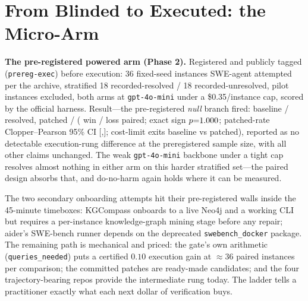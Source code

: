 \documentclass[11pt]{article}
\begin{document}
\section{From Blinded to Executed: the Micro-Arm}
\label{sec:gap}
\EXECpara{}

\textbf{The pre-registered powered arm (Phase 2).} Registered and publicly
tagged (\texttt{prereg-exec}) before execution: 36 fixed-seed instances
SWE-agent attempted per the archive, stratified 18 recorded-resolved / 18
recorded-unresolved, pilot instances excluded, both arms at
\texttt{gpt-4o-mini} under a \$0.35/instance cap, scored by the official
harness. Result---the pre-registered \emph{null} branch fired: baseline
\swExecBase/\swExecN{} resolved, patched \swExecPatch/\swExecN{}
(\swExecWins{} win / \swExecLoss{} loss paired; exact sign
$p{=}1.000$; patched-rate Clopper--Pearson 95\% CI
[\swExecCIlo,\swExecCIhi]; cost-limit exits \swExecCostB{} baseline vs
\swExecCostP{} patched), reported as no detectable execution-rung difference at the preregistered
sample size, with all other claims unchanged. The weak
\texttt{gpt-4o-mini} backbone under a tight cap resolves almost nothing in
either arm on this harder stratified set---the paired design absorbs that,
and do-no-harm again holds where it can be measured.

The two secondary
onboarding attempts hit their pre-registered walls inside the 45-minute
timeboxes: KGCompass onboards to a live Neo4j and a working CLI but requires
a per-instance knowledge-graph mining stage before any repair; aider's
SWE-bench runner depends on the deprecated \texttt{swebench\_docker}
package. The remaining path is mechanical and priced: the gate's own
arithmetic (\texttt{queries\_needed}) puts a certified $0.10$ execution gain
at $\approx$36 paired instances per comparison; the \swApplied{} committed
patches are ready-made candidates; and the four trajectory-bearing repos
provide the intermediate rung today. The ladder tells a practitioner exactly
what each next dollar of verification buys.
\end{document}
